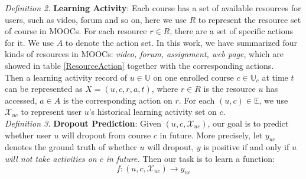 	\emph{Definition 2.} \textbf{Learning Activity}: 
	Each course has a set of available resources for users, such as video, forum and so on, here we use $R$ to represent the resource set of course in MOOCs. For each resource $r \in R$, there are a set of specific actions for it. We use $A$ to denote the action set. In this work, we have summarized four kinds of resources in MOOCs: \emph{video, forum, assignment, web page}, which are showed in table \ref{ResourceAction} together with the corresponding actions. \\
	Then a learning activity record of $u\in \mathbb{U}$ on one enrolled course $c\in \mathbb{U}_c$ at time $t$ can be represented as $X=(u,c,r,a,t)$, where $r\in R$ is the resource $u$ has accessed, $a\in A$ is the corresponding action on $r$. For each $(u,c) \in \mathbb{E}$, we use $\mathcal{X}_{uc}$ to represent user $u$'s historical learning activity set on $c$.\\
	
	\emph{Definition 3.} \textbf{Dropout Prediction}: 
	Given $(u, c, \mathcal{X}_{uc})$, our goal is to predict whether user $u$ will dropout from course $c$ in future. More precisely, let $y_{uc}$ denotes the ground truth of whether $u$ will dropout, $y$ is positive if and only if \emph{$u$ will not take activities on $c$ in future.} Then our task is to learn a function:
	 $$f: (u,c,\mathcal{X}_{uc})\to y_{uc}$$
	

